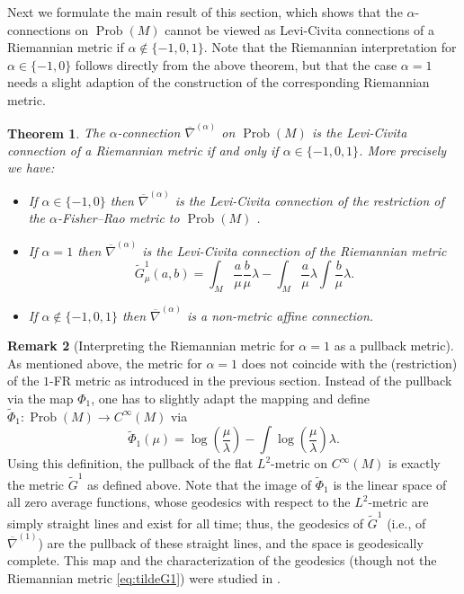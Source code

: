 \documentclass[11pt,reqno]{amsart}
\newtheorem{theorem}{Theorem}[section]
\theoremstyle{definition}
\newtheorem{remark}[theorem]{Remark}
\newcommand{\dx}{\lambda}
\newcommand{\Prob}{\operatorname{Prob}(M)}
\newcommand{\nabar}{\overline{\nabla}^{(\alpha)}}
\begin{document}
Next we formulate the main result of this section, which shows that the $\alpha$-connections on $\Prob$ cannot be viewed as Levi-Civita connections of a Riemannian metric if $\alpha \notin \{-1,0,1\}$. Note that the Riemannian interpretation for $\alpha \in \{-1,0\}$ follows directly from the above theorem, but that the case $\alpha=1$ needs a slight adaption of the construction of the corresponding Riemannian metric. 
\begin{theorem}\label{thm:alpha_nonmetric}
The  $\alpha$-connection $\nabar$ on $\Prob$ is the Levi-Civita connection of a Riemannian metric if and only if $\alpha\in\{-1,0,1\}$. More precisely we have:
\begin{itemize}
\item If $\alpha\in \{-1,0\}$ then $\nabar$ is the Levi-Civita connection 
of the restriction of the $\alpha$-Fisher--Rao metric to $\Prob$ .
\item If $\alpha=1$ then $\nabar$ is the Levi-Civita connection 
of the Riemannian metric 
\begin{equation}\label{eq:tildeG1}
\tilde G^1_{\mu}(a,b)=\int_M\frac{a}{\mu}\frac{b}{\mu}\dx -\int_M\frac{a}{\mu}\dx \int \frac{b}{\mu}\dx.
\end{equation}
\item If $\alpha \notin \{-1,0,1\}$ then $\nabar$ is a non-metric affine connection.
\end{itemize}
\end{theorem}
\begin{remark}[Interpreting the Riemannian metric for $\alpha=1$ as a pullback metric]
\label{rem:alpha1} As mentioned above, the metric for $\alpha=1$ does not coincide with the (restriction) of the $1$-FR metric as introduced in the previous section. Instead of the pullback via the map $\Phi_1$, one has to slightly adapt the mapping and define $\tilde\Phi_1:\Prob\to C^{\infty}(M)$ via
\begin{equation*}
\tilde\Phi_1(\mu)= \log\left(\frac{\mu}{\lambda}\right)-\int \log\left(\frac{\mu}{\lambda}\right)\lambda.
\end{equation*}
Using this definition, the pullback of the flat $L^2$-metric on $C^{\infty}(M)$ is exactly the metric $\tilde{G}^1$ %
as defined above.
Note that the image of $\tilde{\Phi}_1$ is the linear space of all zero average functions, whose geodesics with respect to the $L^2$-metric are simply straight lines and exist for all time; thus, the geodesics of $\tilde{G}^1$ (i.e., of $\overline{\nabla}^{(1)}$) are the pullback of these straight lines, and the space is geodesically %
complete.
This map and the characterization of the geodesics (though not the Riemannian metric \eqref{eq:tildeG1}) were studied in \cite{lenells2014amari}.
\end{remark}
\end{document}
